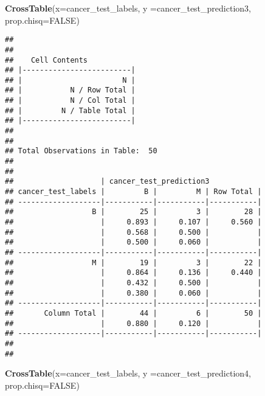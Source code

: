 \documentclass[]{article}
\newenvironment{Shaded}{\begin{snugshade}}{\end{snugshade}}
\newcommand{\KeywordTok}[1]{\textcolor[rgb]{0.13,0.29,0.53}{\textbf{#1}}}
\newcommand{\DataTypeTok}[1]{\textcolor[rgb]{0.13,0.29,0.53}{#1}}
\newcommand{\OtherTok}[1]{\textcolor[rgb]{0.56,0.35,0.01}{#1}}
\newcommand{\NormalTok}[1]{#1}
\begin{document}
\begin{Shaded}
\begin{Highlighting}[]
\KeywordTok{CrossTable}\NormalTok{(}\DataTypeTok{x=}\NormalTok{cancer_test_labels, }\DataTypeTok{y =}\NormalTok{cancer_test_prediction3, }\DataTypeTok{prop.chisq=}\OtherTok{FALSE}\NormalTok{)}
\end{Highlighting}
\end{Shaded}

\begin{verbatim}
## 
##  
##    Cell Contents
## |-------------------------|
## |                       N |
## |           N / Row Total |
## |           N / Col Total |
## |         N / Table Total |
## |-------------------------|
## 
##  
## Total Observations in Table:  50 
## 
##  
##                    | cancer_test_prediction3 
## cancer_test_labels |         B |         M | Row Total | 
## -------------------|-----------|-----------|-----------|
##                  B |        25 |         3 |        28 | 
##                    |     0.893 |     0.107 |     0.560 | 
##                    |     0.568 |     0.500 |           | 
##                    |     0.500 |     0.060 |           | 
## -------------------|-----------|-----------|-----------|
##                  M |        19 |         3 |        22 | 
##                    |     0.864 |     0.136 |     0.440 | 
##                    |     0.432 |     0.500 |           | 
##                    |     0.380 |     0.060 |           | 
## -------------------|-----------|-----------|-----------|
##       Column Total |        44 |         6 |        50 | 
##                    |     0.880 |     0.120 |           | 
## -------------------|-----------|-----------|-----------|
## 
## 
\end{verbatim}

\begin{Shaded}
\begin{Highlighting}[]
\KeywordTok{CrossTable}\NormalTok{(}\DataTypeTok{x=}\NormalTok{cancer_test_labels, }\DataTypeTok{y =}\NormalTok{cancer_test_prediction4, }\DataTypeTok{prop.chisq=}\OtherTok{FALSE}\NormalTok{)}
\end{Highlighting}
\end{Shaded}
\end{document}
